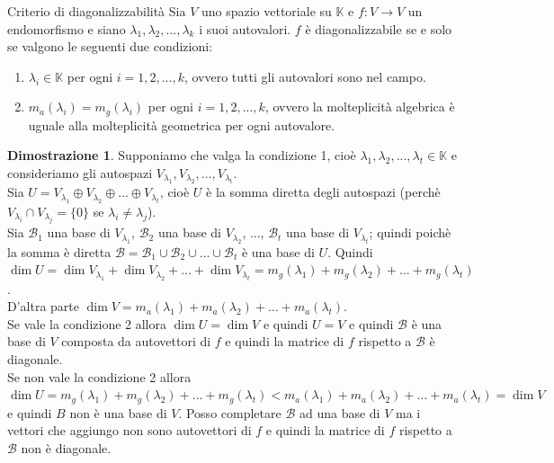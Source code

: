 \documentclass[a4paper]{article}
\theoremstyle{definition}
\newtheorem*{dimm}{Dimostrazione}
\begin{document}
	\begin{teo}{Criterio di diagonalizzabilità}{}
		Sia $V$ uno spazio vettoriale su $\mathbb{K}$ e $f: V \to V$ un endomorfismo e siano $\lambda_1, \lambda_2, ..., \lambda_k$ i suoi autovalori.
		$f$ è diagonalizzabile se e solo se valgono le seguenti due condizioni:
		\begin{enumerate}
			\item $\lambda_i \in \mathbb{K}$ per ogni $i = 1, 2, ..., k$, ovvero tutti gli autovalori sono nel campo.
			\item $m_a(\lambda_i) = m_g(\lambda_i)$ per ogni $i = 1, 2, ..., k$, ovvero la molteplicità algebrica è uguale alla molteplicità geometrica per ogni autovalore.
		\end{enumerate}
	\end{teo}

	\begin{dimm}
		Supponiamo che valga la condizione 1, cioè $\lambda_1, \lambda_2, ..., \lambda_t \in \mathbb{K}$ e consideriamo gli autospazi $V_{\lambda_1}, V_{\lambda_2}, ..., V_{\lambda_t}$. \\
		Sia $U = V_{\lambda_1} \oplus V_{\lambda_2} \oplus ... \oplus V_{\lambda_t}$, cioè $U$ è la somma diretta degli autospazi (perchè $V_{\lambda_i} \cap V_{\lambda_j} = \{0\}$ se $\lambda_i \ne \lambda_j$). \\
		Sia $\mathcal{B}_1$ una base di $V_{\lambda_1}$, $\mathcal{B}_2$ una base di $V_{\lambda_2}$, ..., $\mathcal{B}_t$ una base di $V_{\lambda_t}$;
		quindi poichè la somma è diretta $\mathcal{B} = \mathcal{B}_1 \cup \mathcal{B}_2 \cup ... \cup \mathcal{B}_t$ è una base di $U$.
		Quindi $\dim U = \dim V_{\lambda_1} + \dim V_{\lambda_2} + ... + \dim V_{\lambda_t} = m_g(\lambda_1) + m_g(\lambda_2) + ... + m_g(\lambda_t)$. \\
		D'altra parte $\dim V = m_a(\lambda_1) + m_a(\lambda_2) + ... + m_a(\lambda_t)$. \\
		Se vale la condizione 2 allora $\dim U = \dim V$ e quindi $U = V$ e quindi $\mathcal{B}$ è una base di $V$ composta da autovettori di $f$ e quindi la matrice di $f$ rispetto a $\mathcal{B}$ è diagonale. \\
		Se non vale la condizione 2 allora $\dim U = m_g(\lambda_1) + m_g(\lambda_2) + ... + m_g(\lambda_t) < m_a(\lambda_1) + m_a(\lambda_2) + ... + m_a(\lambda_t) = \dim V$ e quindi $B$ non è una base di $V$.
		Posso completare $\mathcal{B}$ ad una base di $V$ ma i vettori che aggiungo non sono autovettori di $f$ e quindi la matrice di $f$ rispetto a $\mathcal{B}$ non è diagonale.
	\end{dimm}
\end{document}
